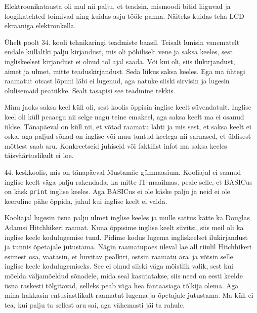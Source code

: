 Elektroonikatausta oli mul nii palju, et teadsin, mismoodi bitid 
liiguvad ja loogikatehted toimivad ning kuidas asju tööle panna. 
Näiteks kuidas teha LCD-ekraaniga elektronkella. 


Ühelt poolt 34. kooli tehnikaringi teadmiste baasil. Teisalt lunisin vanematelt 
endale küllaltki palju kirjandust, mis oli põhiliselt vene ja saksa 
keeles, sest ingliskeelset kirjandust ei olnud tol ajal saada. Või 
kui oli, siis ilukirjandust, aimet ja ulmet, mitte 
teaduskirjandust. Seda liikus saksa keeles. Ega ma ühtegi
raamatut otsast lõpuni läbi ei lugenud, aga 
natuke siiski sirvisin ja lugesin olulisemaid peatükke. Sealt 
tasapisi see teadmine tekkis.


Minu jaoks saksa keel küll oli, sest koolis õppisin inglise keelt 
süvendatult. Inglise keel oli küll peaaegu nii selge nagu teine emakeel, aga saksa keelt ma ei osanud üldse. 
Tänapäeval on küll nii, et võtad raamatu lahti ja mis sest, et saksa 
keelt ei oska, aga paljud sõnad on inglise või muu tuntud keelega nii sarnased, et üldisest mõttest saab aru. 
Konkreetseid juhiseid või faktilist infot ma saksa keeles 
täisväärtuslikult ei loe. 


44. keskkoolis, mis on tänapäeval Mustamäe 
gümnaasium. Kooliajal ei saanud inglise keelt väga palju rakendada, ka mitte 
IT-maailmas,
peale selle, et BASICus on käsk \verb|print| inglise keeles. Aga 
BASICus ei ole käske palju ja neid ei ole keeruline pähe 
õppida, juhul kui inglise keelt ei valda. 


Kooliajal lugesin üsna palju ulmet inglise keeles ja 
mulle sattus kätte ka Douglas Adamsi Hitchhikeri raamat.
Kuna õppisime inglise keelt süvitsi, siis meil oli ka
inglise keele kodulugemise tund. Pidime kodus lugema ingliskeelset
ilukirjandust ja tunnis õpetajale jutustama. Nägin raamatupoes 
üleval lae all riiulil Hitchhikeri esimest osa, 
vaatasin, et huvitav pealkiri, ostsin raamatu ära ja võtsin selle inglise keele kodulugemiseks. See ei olnud siiski väga mõistlik 
valik, sest kui mõelda väljamõeldud sõnadele, mida seal kasutatakse, siis need on 
eesti keelde üsna raskesti tõlgitavad, selleks peab väga hea fantaasiaga tõlkija 
olema. Aga mina hakkasin entusiastlikult raamatut lugema ja õpetajale jutustama. Ma 
küll ei tea, kui palju ta sellest aru sai, aga vähemasti jäi ta rahule. 

